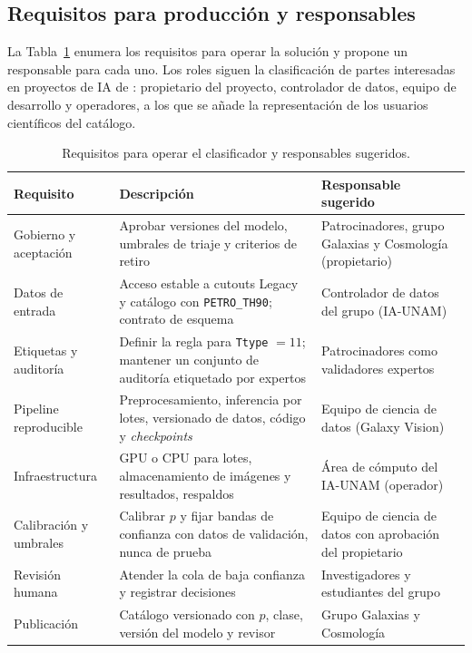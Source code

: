 \documentclass[letterpaper,11pt]{article}
\begin{document}
\subsection{Requisitos para producción y responsables}
La Tabla~\ref{tab:requisitos} enumera los requisitos para operar la solución y propone un responsable para cada uno. Los roles siguen la clasificación de partes interesadas en proyectos de IA de \textcite{miller2022}: propietario del proyecto, controlador de datos, equipo de desarrollo y operadores, a los que se añade la representación de los usuarios científicos del catálogo.

\begin{table}[H]
  \centering
  \caption{Requisitos para operar el clasificador y responsables sugeridos.}
  \label{tab:requisitos}
  \small
  \begin{tabular}{p{3.6cm}p{6.6cm}p{4.2cm}}
    \toprule
    Requisito & Descripción & Responsable sugerido \\
    \midrule
    Gobierno y aceptación & Aprobar versiones del modelo, umbrales de triaje y criterios de retiro & Patrocinadores, grupo Galaxias y Cosmología (propietario) \\
    Datos de entrada & Acceso estable a cutouts Legacy y catálogo con \texttt{PETRO\_TH90}; contrato de esquema & Controlador de datos del grupo (IA-UNAM) \\
    Etiquetas y auditoría & Definir la regla para \texttt{Ttype} $= 11$; mantener un conjunto de auditoría etiquetado por expertos & Patrocinadores como validadores expertos \\
    Pipeline reproducible & Preprocesamiento, inferencia por lotes, versionado de datos, código y \emph{checkpoints} & Equipo de ciencia de datos (Galaxy Vision) \\
    Infraestructura & GPU o CPU para lotes, almacenamiento de imágenes y resultados, respaldos & Área de cómputo del IA-UNAM (operador) \\
    Calibración y umbrales & Calibrar $p$ y fijar bandas de confianza con datos de validación, nunca de prueba & Equipo de ciencia de datos con aprobación del propietario \\
    Revisión humana & Atender la cola de baja confianza y registrar decisiones & Investigadores y estudiantes del grupo \\
    Publicación & Catálogo versionado con $p$, clase, versión del modelo y revisor & Grupo Galaxias y Cosmología \\
    \bottomrule
  \end{tabular}
\end{table}
\end{document}
